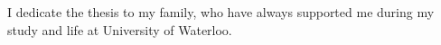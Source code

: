 I dedicate the thesis to my family, who have always supported me during my study and life at University of Waterloo.
\cleardoublepage

\renewcommand\contentsname{Table of Contents}
\tableofcontents
\cleardoublepage
{}    %

\listoffigures
\cleardoublepage
{}		%

\listoftables
\cleardoublepage
{}		%


